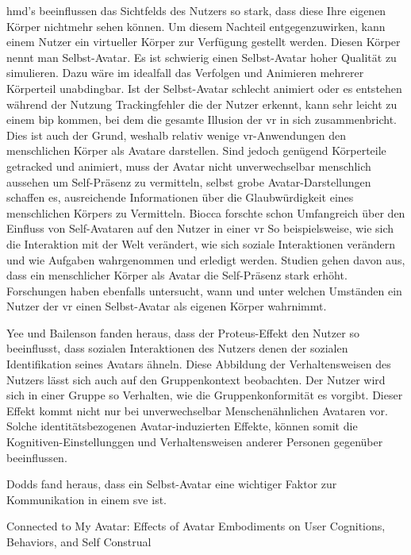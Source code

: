 \documentclass[a4paper,11pt]{article}%
\renewcommand{\\}{\vspace*{0.5\baselineskip} \newline}
\begin{document}
\ac{hmd}'s beeinflussen das Sichtfelds des Nutzers so stark, dass diese Ihre eigenen Körper nichtmehr sehen können. Um diesem Nachteil entgegenzuwirken, kann einem Nutzer ein virtueller Körper zur Verfügung gestellt werden. Diesen Körper nennt man Selbst-Avatar.
Es ist schwierig einen Selbst-Avatar hoher Qualität zu simulieren. Dazu wäre im idealfall das Verfolgen und Animieren mehrerer Körperteil unabdingbar. Ist der Selbst-Avatar schlecht animiert oder es entstehen während der Nutzung Trackingfehler die der Nutzer erkennt, kann sehr leicht zu einem \ac{bip} kommen, bei dem die gesamte Illusion der \ac{vr} in sich zusammenbricht. 
Dies ist auch der Grund, weshalb relativ wenige \ac{vr}-Anwendungen den menschlichen Körper als Avatare darstellen.
Sind jedoch genügend Körperteile getracked und animiert, muss der Avatar nicht unverwechselbar menschlich aussehen um Self-Präsenz zu vermitteln, selbst grobe Avatar-Darstellungen schaffen es, ausreichende Informationen über die Glaubwürdigkeit eines menschlichen Körpers zu Vermitteln.\citep{lok2003effects}
Biocca forschte schon Umfangreich über den Einfluss von Self-Avataren auf den Nutzer in einer \ac{vr} \citep[421-427]{construal2014connected} So beispielsweise, wie sich die Interaktion mit der Welt verändert, wie sich soziale Interaktionen verändern und wie Aufgaben wahrgenommen und erledigt werden. \citep{benford1995user} \citep{bowers1996talk}
Studien gehen davon aus, dass ein menschlicher Körper als Avatar die Self-Präsenz stark erhöht.
Forschungen haben ebenfalls untersucht, wann und unter welchen Umständen ein Nutzer der \ac{vr} einen Selbst-Avatar als eigenen Körper wahrnimmt. 

Yee und Bailenson fanden heraus, dass der Proteus-Effekt den Nutzer so beeinflusst, dass sozialen Interaktionen des Nutzers denen der sozialen Identifikation seines Avatars ähneln. \citep{ratan2015leveling} Diese Abbildung der Verhaltensweisen des Nutzers lässt sich auch auf den Gruppenkontext beobachten. Der Nutzer wird sich in einer Gruppe so Verhalten, wie die Gruppenkonformität es vorgibt.
Dieser Effekt kommt nicht nur bei unverwechselbar Menschenähnlichen Avataren vor. \citep{lok2003effects} 
Solche identitätsbezogenen Avatar-induzierten Effekte, können somit die Kognitiven-Einstellunggen und Verhaltensweisen anderer Personen gegenüber beeinflussen.

Dodds fand heraus, dass ein Selbst-Avatar eine wichtiger Faktor zur Kommunikation in einem \ac{sve} ist. \citep[1-11]{dodds2011talk}

Connected to My Avatar:
Effects of Avatar Embodiments on User Cognitions, Behaviors,
and Self Construal 
\end{document}
